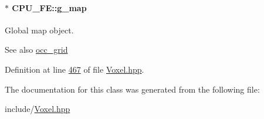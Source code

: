 \paragraph[{\texorpdfstring{g\+\_\+map}{g_map}}]{$\ast$ C\+P\+U\+\_\+\+F\+E\+::g\+\_\+map\hspace{0.3cm}{\ttfamily [private]}}\hypertarget{classCPU__FE_ad3779fc0a23127e425d8f0fc3c2661dc}{}\label{classCPU__FE_ad3779fc0a23127e425d8f0fc3c2661dc}


Global map object. 

\begin{DoxySeeAlso}{See also}
\hyperlink{classocc__grid}{occ\+\_\+grid} 
\end{DoxySeeAlso}


Definition at line \hyperlink{Voxel_8hpp_source_l00467}{467} of file \hyperlink{Voxel_8hpp_source}{Voxel.\+hpp}.



The documentation for this class was generated from the following file\+:\begin{DoxyCompactItemize}
\item 
include/\hyperlink{Voxel_8hpp}{Voxel.\+hpp}\end{DoxyCompactItemize}
